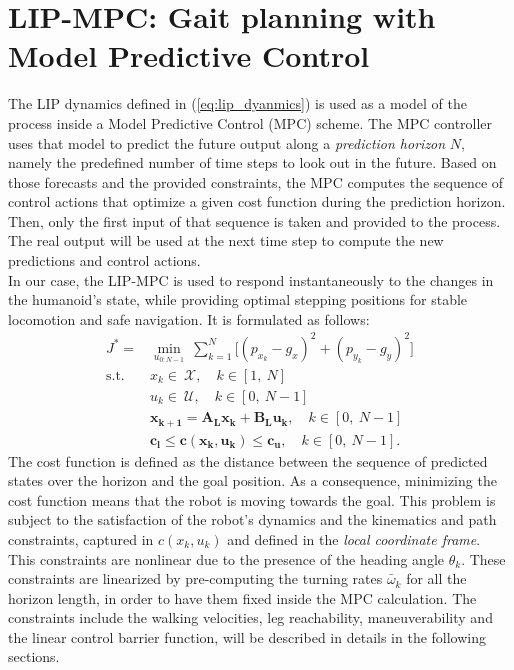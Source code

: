 \section{LIP-MPC: Gait planning with Model Predictive Control}\label{sec:mpc}
The LIP dynamics defined in (\ref{eq:lip_dyanmics}) is used as a model of the process inside a Model Predictive Control (MPC) scheme. The MPC controller uses that model to predict the future output along a \textit{prediction horizon} $N$, namely the predefined number of time steps to look out in the future. Based on those forecasts and the provided constraints, the MPC computes the sequence of control actions that optimize a given cost function during the prediction horizon. Then, only the first input of that sequence is taken and provided to the process. The real output will be used at the next time step to compute the new predictions and control actions.\\
In our case, the LIP-MPC is used to respond instantaneously to the changes in the humanoid's state, while providing optimal stepping positions for stable locomotion and safe navigation. It is formulated as follows:
\begin{equation}
    \begin{aligned}
    J^* =& \min_{u_{0:N-1}} \ \sum_{k=1}^{N} \Big[(p_{x_{k}} - g_{x})^2+(p_{y_{k}} - g_{y})^2\Big] \\
    \text{s.t.} \quad 
    & x_{k} \in \ \mathcal{X}, \quad k \in [1,\ N] \\
    & u_{k} \in \ \mathcal{U}, \quad k \in [0,\ N-1] \\
    & \mathbf{x_{k+1}} = \mathbf{A_{L}x_{k}} + \mathbf{B_{L}u_{k}}, \quad k \in [0,\ N-1] \\
    & \mathbf{c_{l}} \le \mathbf{c(x_{k}, u_{k})} \le \mathbf{c_{u}}, \quad k \in [0,\ N-1].
    \end{aligned}
\end{equation}
The cost function is defined as the distance between the sequence of predicted states over the horizon and the goal position. As a consequence, minimizing the cost function means that the robot is moving towards the goal. This problem is subject to the satisfaction of the robot's dynamics and the kinematics and path constraints, captured in $c(x_{k}, u_{k})$ and defined in the \textit{local coordinate frame}. This constraints are nonlinear due to the presence of the heading angle $\theta_{k}$. These constraints are linearized by pre-computing the turning rates $\bar{\omega}_{k}$ for all the horizon length, in order to have them fixed inside the MPC calculation.
The constraints include the walking velocities, leg reachability, maneuverability and the linear control barrier function, will be described in details in the following sections.


